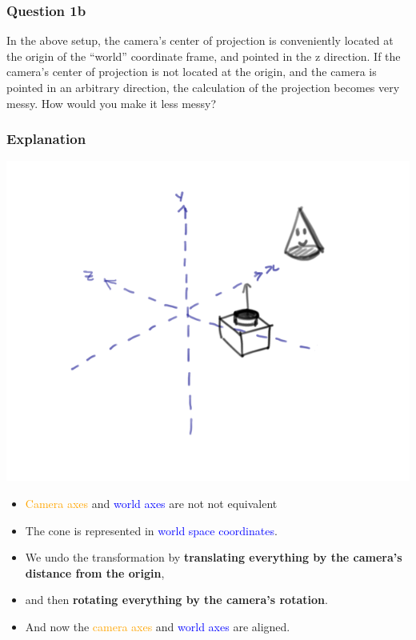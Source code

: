 \documentclass{beamer}
\begin{document}
\begin{frame}
    \frametitle{Question 1b}
    In the above setup, the camera's center of projection is conveniently located at the origin of the “world” coordinate frame, 
    and pointed in the z direction. If the camera's center of projection is not located at the origin, and the camera is pointed in an 
    arbitrary direction, the calculation of the projection becomes very messy. How would you make it less messy?
\end{frame}

\begin{frame}
    \frametitle{Explanation}

    \begin{center}
        \includegraphics[]{q1b-orig.png}
    \end{center}

    \small
    \begin{itemize}
        \item \textcolor{orange}{Camera axes} and \textcolor{blue}{world axes} are not not equivalent
        \item The cone is represented in \textcolor{blue}{world space coordinates}.
        \item We undo the transformation by \textbf{translating everything by the camera's distance from the origin},
        \item and then \textbf{rotating everything by the camera's rotation}.
        \item And now the \textcolor{orange}{camera axes} and \textcolor{blue}{world axes} are aligned.
    \end{itemize}

\end{frame}
\end{document}
